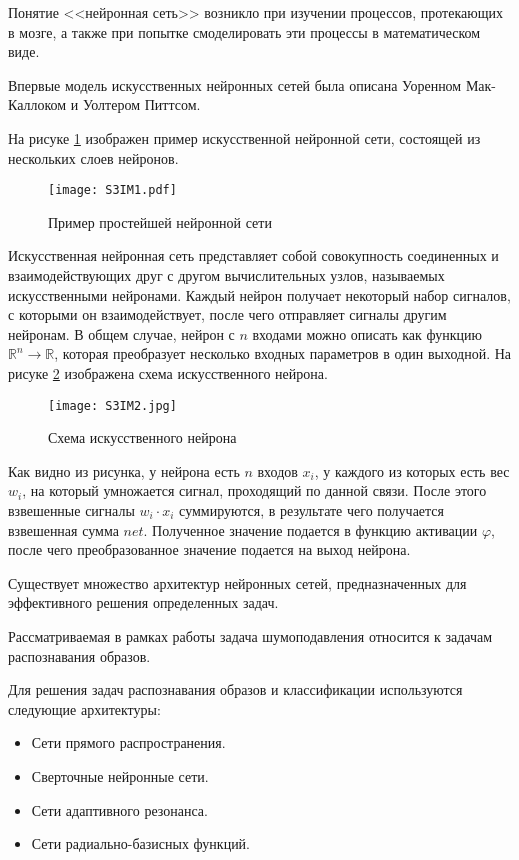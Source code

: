 Понятие <<нейронная сеть>> возникло при изучении процессов, протекающих в мозге,
а также при попытке смоделировать эти процессы в математическом виде.

Впервые модель искусственных нейронных сетей была описана Уоренном Мак-Каллоком
и Уолтером Питтсом.

На рисуке \ref{fig:section3:simple_nn} изображен пример искусственной нейронной сети,
состоящей из нескольких слоев нейронов.

\begin{figure}[h!]
    \centering
    \texttt{[image: S3IM1.pdf]}
    \caption{Пример простейшей нейронной сети}
    \label{fig:section3:simple_nn}
\end{figure}

Искусственная нейронная сеть представляет собой совокупность соединенных и взаимодействующих
друг с другом вычислительных узлов, называемых искусственными нейронами.
Каждый нейрон получает некоторый набор сигналов, с которыми он взаимодействует,
после чего отправляет сигналы другим нейронам. В общем случае, нейрон с $n$ входами
можно описать как функцию $\mathbb{R}^{n} \rightarrow \mathbb{R}$, которая преобразует несколько
входных параметров в один выходной.
На рисуке \ref{fig:section3:neuron} изображена схема искусственного нейрона.

\begin{figure}[h!]
    \centering
    \texttt{[image: S3IM2.jpg]}
    \caption{Схема искусственного нейрона}
    \label{fig:section3:neuron}
\end{figure}

Как видно из рисунка, у нейрона есть $n$ входов $x_i$, у каждого  из которых
есть вес $w_i$, на который умножается сигнал, проходящий по данной связи.
После этого взвешенные сигналы $w_i \cdot x_i$ суммируются, в результате чего
получается взвешенная сумма $net$. 
Полученное значение подается в функцию активации $\varphi$, 
после чего преобразованное значение подается на выход нейрона.

Существует множество архитектур нейронных сетей, 
предназначенных для эффективного решения определенных задач.

Рассматриваемая в рамках работы задача шумоподавления относится к задачам распознавания образов.

Для решения задач распознавания образов и классификации используются следующие
архитектуры:
\begin{itemize}
    \item Сети прямого распространения.
    \item Сверточные нейронные сети.
    \item Сети адаптивного резонанса.
    \item Сети радиально-базисных функций.
\end{itemize}

